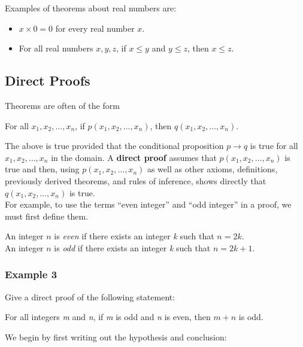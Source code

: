 Examples of theorems about real numbers are:

\begin{itemize}
    \item $x \times 0 = 0$ for every real number $x$.
    \item For all real numbers $x, y, z$, if $x \leq y$ and $y \leq z$, then $x \leq z$.
\end{itemize}

\subsection*{Direct Proofs}

Theorems are often of the form
\begin{center}
    For all $x_1, x_2, \dots, x_n$, if $p(x_1, x_2, \dots, x_n)$, then $q(x_1, x_2, \dots, x_n)$.
\end{center}

The above is true provided that the conditional proposition $p \rightarrow q$ is true for all $x_1, x_2, \dots, x_n$ in the domain.  A \textbf{direct proof} assumes that $p(x_1, x_2, \dots, x_n)$ is true and then, using $p(x_1, x_2, \dots, x_n)$ as well as other axioms, definitions, previously derived theorems, and rules of inference, shows directly that $q(x_1, x_2, \dots, x_n)$ is true.\\

For example, to use the terms ``even integer'' and ``odd integer'' in a proof, we must first define them.
\begin{center}
    An integer $n$ is \textit{even} if there exists an integer \textit{k} such that $n = 2k$.\\
    An integer $n$ is \textit{odd} if there exists an integer \textit{k} such that $n = 2k + 1$.
\end{center}

\subsubsection*{Example 3}

Give a direct proof of the following statement:
\begin{center}
    For all integers \textit{m} and \textit{n}, if \textit{m} is odd and \textit{n} is even, then $m + n$ is odd.
\end{center}

We begin by first writing out the hypothesis and conclusion:

